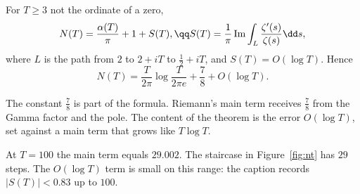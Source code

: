 \begin{theorem}\label{thm:rvm}
For $T\ge3$ not the ordinate of a zero,
\[
\begin{gathered}N(T)=\frac{\alpha(T)}\pi+1+S(T),\qq S(T)=\frac1\pi\operatorname{Im}\int_L\frac{\zeta'(s)}{\zeta(s)}\dd s,\end{gathered}
\]
where $L$ is the path from $2$ to $2+iT$ to $\frac12+iT$, and $S(T)=O(\log T)$. Hence
\[
N(T)=\frac T{2\pi}\log\frac T{2\pi e}+\frac78+O(\log T).
\]
\end{theorem}

The constant $\frac78$ is part of the formula. Riemann's main term receives $\frac78$ from the Gamma factor and the pole. The content of the theorem is the error $O(\log T)$, set against a main term that grows like $T\log T$.

At $T=100$ the main term equals $29.002$. The staircase in Figure~\ref{fig:nt} has $29$ steps. The $O(\log T)$ term is small on this range: the caption records $|S(T)|<0.83$ up to $100$.

